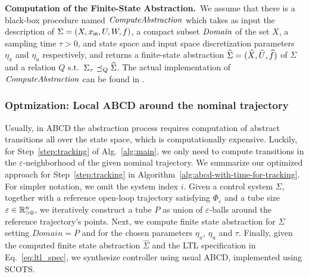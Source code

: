 \smallskip
\noindent\textbf{Computation of the Finite-State Abstraction.}\
We assume that there is a black-box procedure named $\mathit{ComputeAbstraction}$ which takes as input the description of $\Sigma = (X,x_{\mathsf{in}},U,W,f)$, a compact subset $\mathit{Domain}$ of the set $X$, a sampling time $\tau>0$, and state space and input space discretization parameters $\eta_x$ and $\eta_u$ respectively, and returns a finite-state abstraction $\widehat{\Sigma} = (\widehat{X},\widehat{U},\widehat{f})$ of $\Sigma$ and a relation $Q$ s.t.\ $\Sigma_\tau \preceq_{Q} \widehat{\Sigma}$.
The actual implementation of $\mathit{ComputeAbstraction}$ can be found in \cite{reissig2016feedback}.








\subsubsection{Optmization: Local ABCD around the nominal trajectory}\hfill

Usually, in ABCD the abstraction process requires computation of abstract transitions all over the state space, which is computationally expensive.
Luckily, for Step~\ref{step:tracking} of Alg.~\ref{alg:main}, we only need to compute transitions in the $\varepsilon$-neighborhood of the given nominal trajectory.
We summarize our optimized approach for Step~\ref{step:tracking} in Algorithm~\ref{alg:abcd-with-time-for-tracking}.
For simpler notation, we omit the system index $i$.
Given a control system $\Sigma$, together with a reference open-loop trajectory satisfying $\Phi_\varepsilon$ and a tube size $\varepsilon\in \mathbb{R}_{>0}^n$, we iteratively construct a tube $P$ as union of $\varepsilon$-balls around the reference trajectory's points. 
Next, we compute finite state abstraction for $\Sigma$ setting $Domain=P$ and for the chosen parameters $\eta_x$, $\eta_u$ and $\tau$. 
Finally, given the computed finite state abstraction $\widehat \Sigma$ and the LTL specification in Eq.~\eqref{eq:ltl_spec}, we synthesize controller using usual ABCD, implemented using SCOTS. %


